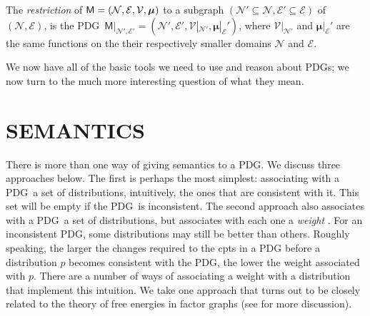 \documentclass{article}
\newcommand{\bmu}{\boldsymbol{\mu}}
\newcommand{\V}{\mathcal V}
\newcommand{\N}{\mathcal N}
\newcommand{\Ed}{\mathcal E}
\newcommand{\sfM}{\mathsf M}
\newcommand{\modelname}{probabilistic dependency graph}
\newcommand{\modelnames}{\modelname s}
\newcommand{\MN}{PDG}
\newcommand{\MNs}{\MN s}
\numberwithin{equation}{section}
\begin{document}
	\begin{defn}[restriction]\label{def:restriction}
		The \emph{restriction} of $\sfM = \mnvars[]$ to a subgraph $(\N' \subseteq \N, \Ed' \subseteq \Ed)$ of $(\N, \Ed)$, is the \MN\, $\sfM|_{\N', \Ed'} = (\N', \Ed', \V |_{\N'}, \bmu|_\Ed')$, where 
		$\V|_{\N'}$ and $\bmu|_\Ed'$ are the same functions on the their respectively smaller domains $\N$ and $\Ed$. 
	\end{defn}
	
	We now have all of the basic tools we need to use and reason about \MNs; we now turn to the much more interesting question of what they mean.


	\section{SEMANTICS}\label{sec:semantics}
	There is more than one way of giving semantics to a \MN.  We discuss three approaches below.
	The first is perhaps the most simplest: associating with a \MN\ a set of distributions, intuitively, the ones that are consistent with it.	This set will be empty if the \MN\ is inconsistent.
	The second approach also associates with a \MN\ a set of distributions, but associates with each one a \emph{weight} \parencite[cf.][]{halpern2015weighted}.  For an inconsistent \MN, some distributions may still be better than others.
	Roughly speaking, the larger the changes required to the cpts in a PDG before a distribution $p$ becomes consistent with the PDG, the lower the weight associated with $p$.  There are a number of ways of associating a weight with a distribution that implement this intuition.  We take one approach that turns out to be closely related to the theory of free energies in factor graphs (see  for more discussion).
\end{document}
